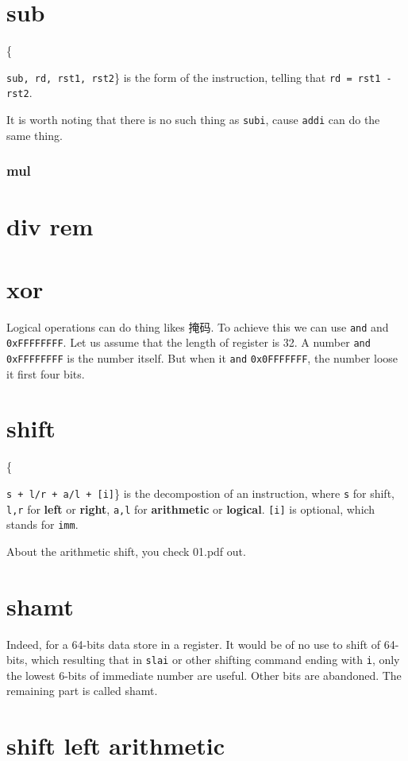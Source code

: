 \documentclass[11pt]{article}
\begin{document}
\section{sub}
\label{sec:orgdf21550}
\centerline\{\texttt{sub, rd, rst1, rst2}\}
is the form of the instruction, telling that \texttt{rd = rst1 - rst2}. 

It is worth noting that there is no such thing as \texttt{subi}, cause \texttt{addi} can do the same thing.
\subsubsection{mul}
\section{div rem}
\label{sec:org89f9e6e}
\section{xor}
\label{sec:orgcebd117}
Logical operations can do thing likes 掩码. To achieve this we can use \texttt{and} and \texttt{0xFFFFFFFF}. Let us assume that the length of register is 32. A number \texttt{and} \texttt{0xFFFFFFFF} is the number itself. But when it \texttt{and} \texttt{0x0FFFFFFF}, the number loose it first four bits.

\section{shift}
\label{sec:orgdde0d9b}
\centerline\{\texttt{s + l/r + a/l + [i]}\}
is the decompostion of an instruction,
where \texttt{s} for shift, \texttt{l,r} for \textbf{left} or \textbf{right}, \texttt{a,l} for \textbf{arithmetic} or \textbf{logical}. \texttt{[i]} is optional, which stands for \texttt{imm}.

About the arithmetic shift, you check 01.pdf out.

\section{shamt}
\label{sec:orgf35e370}
Indeed, for a 64-bits data store in a register. It would be of no use to shift of 64-bits, which resulting that in \texttt{slai} or other shifting command ending with \texttt{i}, only the lowest 6-bits of immediate number are useful. Other bits are abandoned. The remaining part is called shamt. 

\section{shift left arithmetic}
\label{sec:orgbcc7d4b}
\end{document}
